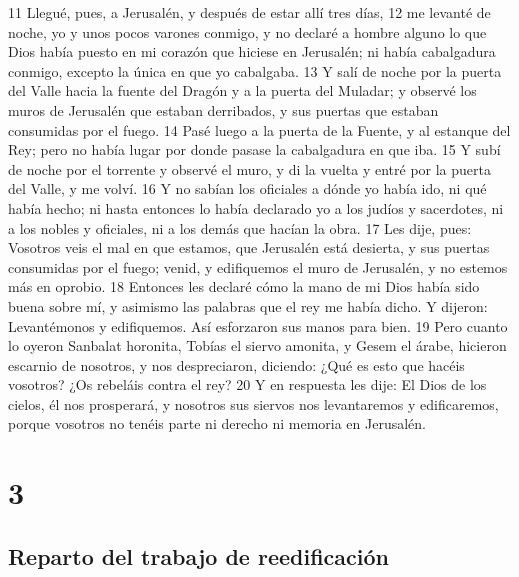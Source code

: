 11 Llegué, pues, a Jerusalén, y después de estar allí tres días,
12 me levanté de noche, yo y unos pocos varones conmigo, y no declaré a hombre alguno lo que Dios había puesto en mi corazón que hiciese en Jerusalén; ni había cabalgadura conmigo, excepto la única en que yo cabalgaba.
13 Y salí de noche por la puerta del Valle hacia la fuente del Dragón y a la puerta del Muladar; y observé los muros de Jerusalén que estaban derribados, y sus puertas que estaban consumidas por el fuego.
14 Pasé luego a la puerta de la Fuente, y al estanque del Rey; pero no había lugar por donde pasase la cabalgadura en que iba.
15 Y subí de noche por el torrente y observé el muro, y di la vuelta y entré por la puerta del Valle, y me volví.
16 Y no sabían los oficiales a dónde yo había ido, ni qué había hecho; ni hasta entonces lo había declarado yo a los judíos y sacerdotes, ni a los nobles y oficiales, ni a los demás que hacían la obra.
17 Les dije, pues: Vosotros veis el mal en que estamos, que Jerusalén está desierta, y sus puertas consumidas por el fuego; venid, y edifiquemos el muro de Jerusalén, y no estemos más en oprobio.
18 Entonces les declaré cómo la mano de mi Dios había sido buena sobre mí, y asimismo las palabras que el rey me había dicho. Y dijeron: Levantémonos y edifiquemos. Así esforzaron sus manos para bien. 
19 Pero cuanto lo oyeron Sanbalat horonita, Tobías el siervo amonita, y Gesem el árabe, hicieron escarnio de nosotros, y nos despreciaron, diciendo: ¿Qué es esto que hacéis vosotros? ¿Os rebeláis contra el rey?
20 Y en respuesta les dije: El Dios de los cielos, él nos prosperará, y nosotros sus siervos nos levantaremos y edificaremos, porque vosotros no tenéis parte ni derecho ni memoria en Jerusalén.

\chapter{3}

\section*{Reparto del trabajo de reedificación}

